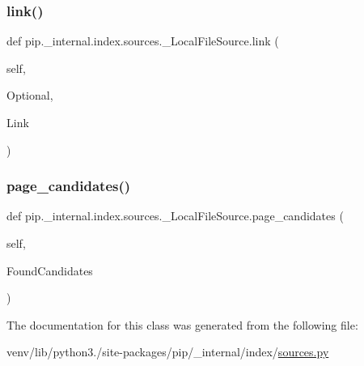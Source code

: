 \subsubsection{\texorpdfstring{link()}{link()}}
{\footnotesize\ttfamily def pip.\+\_\+internal.\+index.\+sources.\+\_\+\+Local\+File\+Source.\+link (\begin{DoxyParamCaption}\item[{}]{self,  }\item[{}]{Optional,  }\item[{}]{Link }\end{DoxyParamCaption})}

\mbox{\label{classpip_1_1__internal_1_1index_1_1sources_1_1__LocalFileSource_a6bb7269454221893f45a8d772cbe654f}} 
\subsubsection{\texorpdfstring{page\+\_\+candidates()}{page\_candidates()}}
{\footnotesize\ttfamily def pip.\+\_\+internal.\+index.\+sources.\+\_\+\+Local\+File\+Source.\+page\+\_\+candidates (\begin{DoxyParamCaption}\item[{}]{self,  }\item[{}]{Found\+Candidates }\end{DoxyParamCaption})}



The documentation for this class was generated from the following file\+:\begin{DoxyCompactItemize}
\item 
venv/lib/python3./site-\/packages/pip/\+\_\+internal/index/\hyperlink{sources_8py}{sources.\+py}\end{DoxyCompactItemize}
